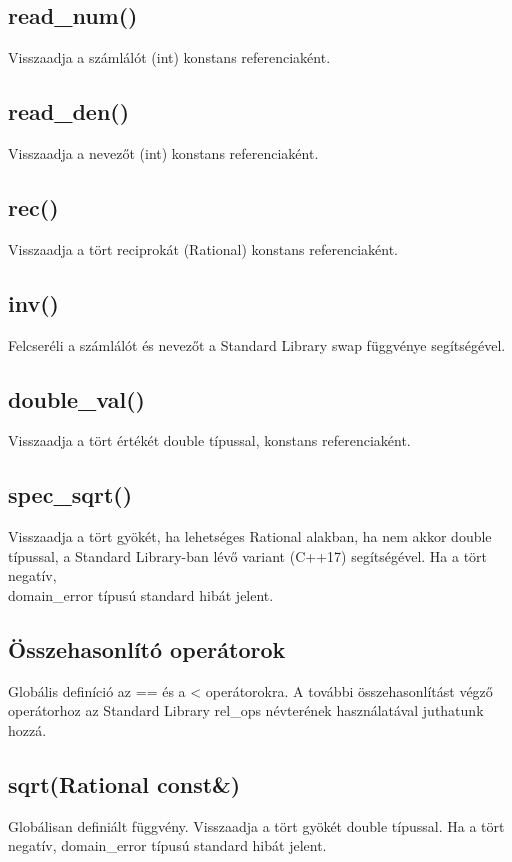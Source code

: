 \documentclass[a4paper, 12pt]{article}
\begin{document}
\subsection*{read\_num()}
Visszaadja a számlálót (int) konstans referenciaként.

\subsection*{read\_den()}
Visszaadja a nevezőt (int) konstans referenciaként.

\subsection*{rec()}
Visszaadja a tört reciprokát (Rational) konstans referenciaként.

\subsection*{inv()}
Felcseréli a számlálót és nevezőt a Standard Library swap függvénye segítségével. 

\subsection*{double\_val()}
Visszaadja a tört értékét double típussal, konstans referenciaként.

\subsection*{spec\_sqrt()}
Visszaadja a tört gyökét, ha lehetséges Rational alakban, ha nem akkor double típussal, a Standard Library-ban lévő variant (C++17)  segítségével. Ha a tört negatív, \\domain\_error típusú standard hibát jelent.

\subsection*{Összehasonlító operátorok}
Globális definíció az == és a < operátorokra. A további összehasonlítást végző operátorhoz az Standard Library rel\_ops névterének használatával juthatunk hozzá.

\subsection*{sqrt(Rational const\&)}
Globálisan definiált függvény. Visszaadja a tört gyökét double típussal. Ha a tört negatív, domain\_error típusú standard hibát jelent.
\end{document}
